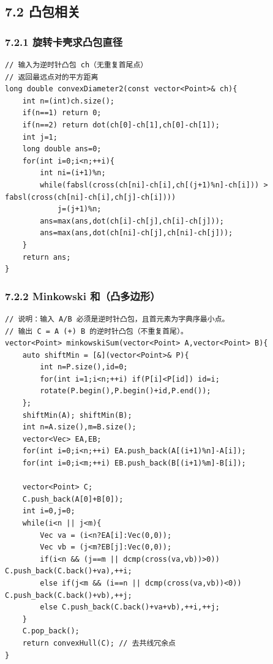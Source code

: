 \documentclass[UTF8,a4paper,11pt]{ctexart}
\begin{document}
\subsection*{7.2 凸包相关}

\subsubsection*{7.2.1 旋转卡壳求凸包直径}

\begin{Verbatim}[fontsize=\small,frame=single,breaklines=true,breakanywhere=true]
// 输入为逆时针凸包 ch（无重复首尾点）
// 返回最远点对的平方距离
long double convexDiameter2(const vector<Point>& ch){
    int n=(int)ch.size();
    if(n==1) return 0;
    if(n==2) return dot(ch[0]-ch[1],ch[0]-ch[1]);
    int j=1;
    long double ans=0;
    for(int i=0;i<n;++i){
        int ni=(i+1)%n;
        while(fabsl(cross(ch[ni]-ch[i],ch[(j+1)%n]-ch[i])) > fabsl(cross(ch[ni]-ch[i],ch[j]-ch[i])))
            j=(j+1)%n;
        ans=max(ans,dot(ch[i]-ch[j],ch[i]-ch[j]));
        ans=max(ans,dot(ch[ni]-ch[j],ch[ni]-ch[j]));
    }
    return ans;
}
\end{Verbatim}
\subsubsection*{7.2.2 Minkowski 和（凸多边形）}

\begin{Verbatim}[fontsize=\small,frame=single,breaklines=true,breakanywhere=true]
// 说明：输入 A/B 必须是逆时针凸包，且首元素为字典序最小点。
// 输出 C = A (+) B 的逆时针凸包（不重复首尾）。
vector<Point> minkowskiSum(vector<Point> A,vector<Point> B){
    auto shiftMin = [&](vector<Point>& P){
        int n=P.size(),id=0;
        for(int i=1;i<n;++i) if(P[i]<P[id]) id=i;
        rotate(P.begin(),P.begin()+id,P.end());
    };
    shiftMin(A); shiftMin(B);
    int n=A.size(),m=B.size();
    vector<Vec> EA,EB;
    for(int i=0;i<n;++i) EA.push_back(A[(i+1)%n]-A[i]);
    for(int i=0;i<m;++i) EB.push_back(B[(i+1)%m]-B[i]);

    vector<Point> C;
    C.push_back(A[0]+B[0]);
    int i=0,j=0;
    while(i<n || j<m){
        Vec va = (i<n?EA[i]:Vec(0,0));
        Vec vb = (j<m?EB[j]:Vec(0,0));
        if(i<n && (j==m || dcmp(cross(va,vb))>0)) C.push_back(C.back()+va),++i;
        else if(j<m && (i==n || dcmp(cross(va,vb))<0)) C.push_back(C.back()+vb),++j;
        else C.push_back(C.back()+va+vb),++i,++j;
    }
    C.pop_back();
    return convexHull(C); // 去共线冗余点
}
\end{Verbatim}
\end{document}
